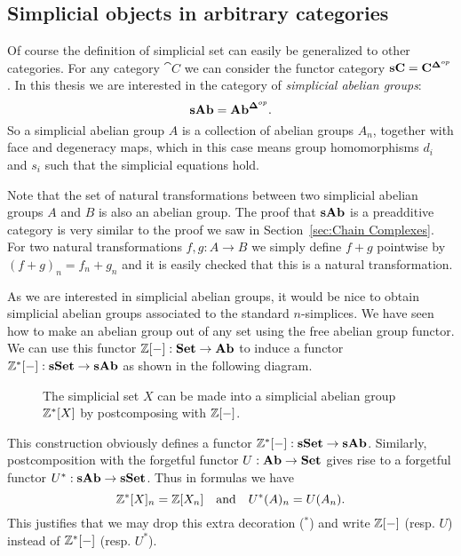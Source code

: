 \subsection{Simplicial objects in arbitrary categories}
Of course the definition of simplicial set can easily be generalized to other categories. For any category $\cat{C}$ we can consider the functor category $\mathbf{sC} = \mathbf{C}^{\mathbf{\Delta}^{op}}$. In this thesis we are interested in the category of \emph{simplicial abelian groups}:
$$ \mathbf{sAb} = \mathbf{Ab}^{\mathbf{\Delta}^{op}}. $$
So a simplicial abelian group $A$ is a collection of abelian groups $A_n$, together with face and degeneracy maps, which in this case means group homomorphisms $d_i$ and $s_i$ such that the simplicial equations hold.

Note that the set of natural transformations between two simplicial abelian groups $A$ and $B$ is also an abelian group. The proof that $\mathbf{sAb}$ is a preadditive category is very similar to the proof we saw in Section~\ref{sec:Chain Complexes}. For two natural transformations $f,g: A \to B$ we simply define $f+g$ pointwise by $(f+g)_n = f_n + g_n$ and it is easily checked that this is a natural transformation.

As we are interested in simplicial abelian groups, it would be nice to obtain simplicial abelian groups associated to the standard $n$-simplices. We have seen how to make an abelian group out of any set using the free abelian group functor. We can use this functor $\mathbb{Z}[-]: \mathbf{Set} \to \mathbf{Ab}$ to induce a functor $\mathbb{Z}^\ast[-]: \mathbf{sSet} \to \mathbf{sAb}$ as shown in the following diagram.
\begin{figure}[h!]
	\caption{The simplicial set $X$ can be made into a simplicial abelian group $\mathbb{Z}^\ast[X]$ by postcomposing with $\mathbb{Z}[-]$.}
	\label{fig:diagram_Z}
\end{figure}
This construction obviously defines a functor $\mathbb{Z}^\ast[-] : \mathbf{sSet} \to \mathbf{sAb}$. Similarly, postcomposition with the forgetful functor $U: \mathbf{Ab} \to \mathbf{Set}$ gives rise to a forgetful functor $U^\ast: \mathbf{sAb} \to \mathbf{sSet}$. Thus in formulas we have
$$ \mathbb{Z}^\ast[X]_n = \mathbb{Z}[X_n] \quad\text{and}\quad U^\ast(A)_n = U(A_n). $$
This justifies that we may drop this extra decoration ($^\ast$) and write $\mathbb{Z}[-]$ (resp. $U$) instead of $\mathbb{Z}^\ast[-]$ (resp. $U^\ast$).

